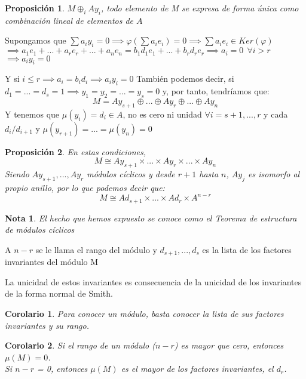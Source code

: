 \documentclass[11pt, a4paper, titlepage]{article}
\makeatletter
\renewenvironment{proof}[1][\proofname] {\vspace{-15pt}\par\pushQED{\qed}\normalfont\topsep6\p@\@plus6\p@\relax\trivlist\item[\hskip\labelsep\it#1\@addpunct{.}]\ignorespaces}{\popQED\endtrivlist\@endpefalse}
\theoremstyle{theorem-style}
\newtheorem*{nprop}{Proposición}
\newtheorem{ncor}{Corolario}
\theoremstyle{definition-style}
\theoremstyle{remark-style}
\newtheorem*{nota}{Nota}
\theoremstyle{example-style}
\makeatother
\begin{document}
\begin{nprop}
	$M \oplus_i Ay_i$, todo elemento de M se expresa de forma única como combinación lineal de elementos de $A$
\end{nprop}
\begin{proof}
	Supongamos que $\sum a_i y_i = 0 \implies \varphi(\sum a_i e_i ) = 0 \implies \sum a_ie_i \in Ker (\varphi) $\\
	$\implies a_1e_1+...+ a_re_r+...+a_ne_n = b_1d_1e_1+...+b_rd_re_r \implies a_i = 0 \ \ \forall i > r$\\
	$\implies a_iy_i = 0$
	
	Y si $i \leq r\implies a_i = b_id_i \implies a_iy_i = 0$
\end{proof}
También podemos decir, si $d_1 = ... = d_s = 1 \implies y_1 = y_2 = ... = y_s = 0$ y, por tanto, tendríamos que:
\[
M = Ay_{s+1}  \oplus ... \oplus Ay_r \oplus ... \oplus Ay_n
\]
Y tenemos que $\mu(y_i) = d_i \in A$, no es cero ni unidad $\forall i = s+1,...,r$ y cada $d_i/d_{i+1}$ y $\mu(y_{r+1}) = ... =\mu(y_n) = 0$

\begin{nprop}
	En estas condiciones,
	\[
	M \cong Ay_{s+1} \times ... \times Ay_r \times ... \times Ay_n
	\]
	Siendo $Ay_{s+1},..., Ay_r$ módulos cíclicos y desde $r+1$ hasta $n$, $Ay_j$ es isomorfo al propio anillo, por lo que podemos decir que:
	\[
	M \cong Ad_{s+1}\times ... \times Ad_r \times A^{n-r}
	\]
\end{nprop}

\begin{nota}
	El hecho que hemos expuesto se conoce como el Teorema de estructura de módulos cíclicos
\end{nota}
A $n-r$ se le llama el rango del módulo y $d_{s+1},...,d_s$ es la lista de los factores invariantes del módulo M

La unicidad de estos invariantes es consecuencia de la unicidad de los invariantes de la forma normal de Smith.

\begin{ncor}
	Para conocer un módulo, basta conocer la lista de sus factores invariantes y su rango.
\end{ncor}
\begin{ncor}
	Si el rango de un módulo ($n-r$) es mayor que cero, entonces $\mu(M) = 0$.\\
	
	Si $n-r$ = 0, entonces $\mu(M) $ es el mayor de los factores invariantes, el $d_r$.
\end{ncor}
\end{document}
